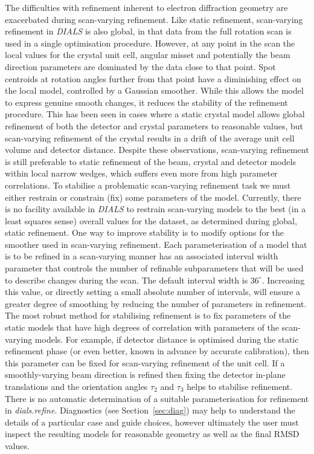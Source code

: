 \documentclass[preprint]{iucr}
\newcommand{\dials}{\emph{DIALS}\xspace}
\newcommand{\dialsrefine}{\emph{dials.refine}\xspace}
\begin{document}
The difficulties with refinement inherent to electron diffraction geometry are
exacerbated during scan-varying refinement. Like static
refinement, scan-varying refinement in \dials is also global, in that data from
the full rotation scan is used in a single optimisation procedure. However, at
any point in the scan the local values for the crystal unit cell, angular
misset and potentially the beam direction parameters are dominated by the data
close to that point. Spot centroids
at rotation angles further from that point have a diminishing effect on the
local model, controlled by a Gaussian smoother. While this allows the
model to express genuine smooth changes,
it reduces the stability of the refinement procedure. This has been seen in
cases where a static crystal model allows global refinement of both the
detector and crystal parameters to reasonable values, but scan-varying
refinement of the crystal results in a drift of the average unit cell volume
and detector distance. Despite these observations, scan-varying refinement is
still preferable to static refinement of the beam, crystal and detector models
within local narrow wedges, which suffers even more from high parameter
correlations. To stabilise a problematic scan-varying refinement task we must
either restrain or constrain (fix) some parameters of the model. Currently,
there is no facility available in \dials to restrain scan-varying models to
the best (in a least squares sense) overall values for the dataset,
as determined during global, static refinement. One way to improve stability
is to modify options for the smoother used in scan-varying
refinement. Each parameterisation of a model that is to be refined in a
scan-varying manner has an associated interval width
parameter that controls the number of refinable subparameters that will be used
to describe changes during the scan. The default interval width is $36^\circ$.
Increasing this value, or directly setting a small absolute number of
intervals, will ensure a greater degree of smoothing by reducing the number of
parameters in refinement. The most robust method for stabilising refinement
is to fix parameters of the static models that have high degrees of correlation
with parameters of the scan-varying models. For example, if detector distance
is optimised during the static refinement phase (or even better, known in
advance by accurate calibration), then this parameter can be fixed for
scan-varying refinement of the unit cell. If a smoothly-varying beam direction
is refined then fixing the detector in-plane translations and the orientation
angles $\tau_2$ and $\tau_3$ helps to stabilise refinement. There is no
automatic determination of a suitable parameterisation for refinement in
\dialsrefine. Diagnostics (see Section~\ref{sec:diag}) may help to understand
the details of a particular case and guide choices, however ultimately the user
must inspect the resulting models for reasonable geometry as well as the final
RMSD values.
\end{document}

